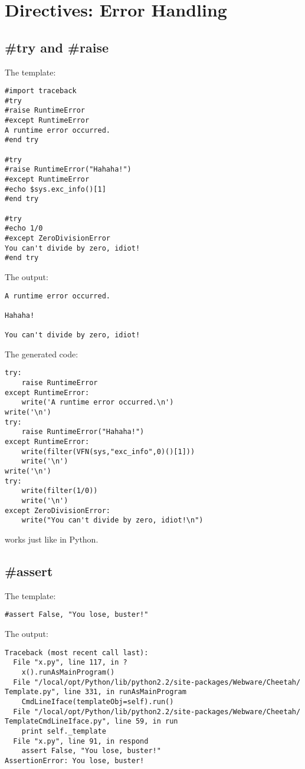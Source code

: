 \section{Directives: Error Handling}
\label{errorHandling}


\subsection{\#try and \#raise}
\label{errorHandling.try}

The template:
\begin{verbatim}
#import traceback
#try
#raise RuntimeError
#except RuntimeError
A runtime error occurred.
#end try

#try
#raise RuntimeError("Hahaha!")
#except RuntimeError
#echo $sys.exc_info()[1]
#end try

#try
#echo 1/0
#except ZeroDivisionError
You can't divide by zero, idiot!
#end try
\end{verbatim}

The output:
\begin{verbatim}
A runtime error occurred.

Hahaha!

You can't divide by zero, idiot!
\end{verbatim}

The generated code:
\begin{verbatim}
try:
    raise RuntimeError
except RuntimeError:
    write('A runtime error occurred.\n')
write('\n')
try:
    raise RuntimeError("Hahaha!")
except RuntimeError:
    write(filter(VFN(sys,"exc_info",0)()[1]))
    write('\n')
write('\n')
try:
    write(filter(1/0))
    write('\n')
except ZeroDivisionError:
    write("You can't divide by zero, idiot!\n")
\end{verbatim}

 works just like in Python.

\subsection{\#assert}
\label{errorHandling.assert}

The template:
\begin{verbatim}
#assert False, "You lose, buster!"
\end{verbatim}

The output:
\begin{verbatim}
Traceback (most recent call last):
  File "x.py", line 117, in ?
    x().runAsMainProgram()
  File "/local/opt/Python/lib/python2.2/site-packages/Webware/Cheetah/
Template.py", line 331, in runAsMainProgram
    CmdLineIface(templateObj=self).run()
  File "/local/opt/Python/lib/python2.2/site-packages/Webware/Cheetah/
TemplateCmdLineIface.py", line 59, in run
    print self._template
  File "x.py", line 91, in respond
    assert False, "You lose, buster!"
AssertionError: You lose, buster!
\end{verbatim}


